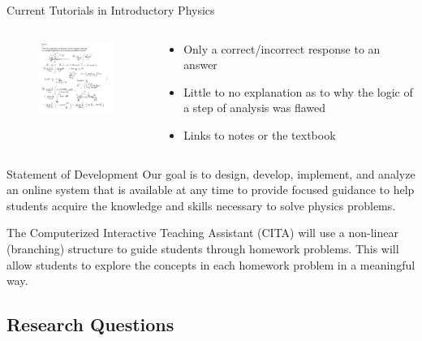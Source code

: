 \documentclass{beamer}
\begin{document}
\begin{frame}{Current Tutorials in Introductory Physics}
\begin{columns}
  \begin{column}{2in}
    \begin{figure}
    \includegraphics[width=2in]{img/presentation/biot-savart}
  \end{figure}
  \end{column}
  \begin{column}{2in}
  \begin{itemize}
    \item Only a correct/incorrect response to an answer
    \item Little to no explanation as to why the logic of a step of analysis was flawed
    \item Links to notes or the textbook
  \end{itemize}
  \end{column}
  \end{columns}
\end{frame}

\begin{frame}{Statement of Development}
Our goal is to design, develop, implement, and analyze an online system that is available at any time to provide focused guidance to help students acquire the knowledge and skills necessary to solve physics problems.
\vspace{5mm}

The Computerized Interactive Teaching Assistant (CITA) will use a non-linear (branching) structure to guide students through homework problems. This will allow students to explore the concepts in each homework problem in a meaningful way.
\end{frame}

\subsection*{Research Questions}
\end{document}
